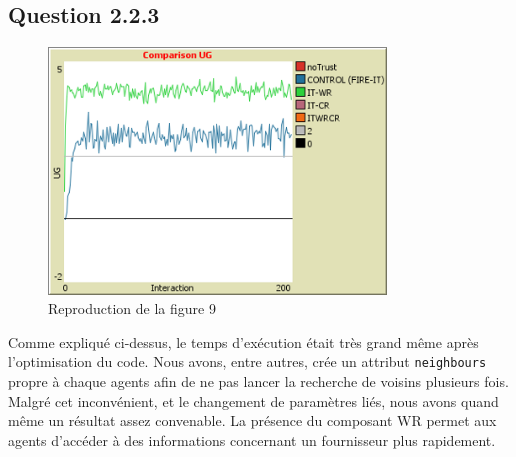 \subsection{Question 2.2.3}
\begin{figure}[H]
    \centering
    \includegraphics[width=0.8\textwidth]{images/ITvsITWR.png}
    \caption{Reproduction de la figure 9}
    \label{fig:itvswr}
\end{figure}

Comme expliqué ci-dessus, le temps d'exécution était très grand même après l'optimisation du code. Nous avons, entre autres, crée un attribut \texttt{neighbours} propre à chaque agents afin de ne pas lancer la recherche de voisins plusieurs fois. Malgré cet inconvénient, et le changement de paramètres liés, nous avons quand même un résultat assez convenable. \newline La présence du composant WR permet aux agents d'accéder à des informations concernant un fournisseur plus rapidement.
